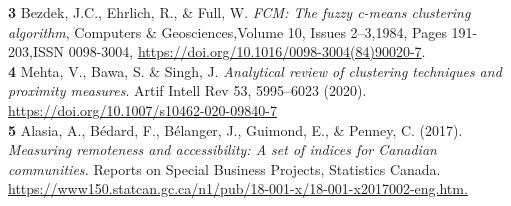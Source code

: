\documentclass[11pt, a4paper]{article}
\begin{document}
\noindent\textbf{3} Bezdek, J.C., Ehrlich, R., \& Full, W. \textit{FCM: The fuzzy c-means clustering algorithm}, Computers \& Geosciences,Volume 10, Issues 2–3,1984, Pages 191-203,ISSN 0098-3004, \sloppy\url{https://doi.org/10.1016/0098-3004(84)90020-7}. \\ %

\noindent\textbf{4} Mehta, V., Bawa, S. \& Singh, J. \textit{Analytical review of clustering techniques and proximity measures}. Artif Intell Rev 53, 5995–6023 (2020). \sloppy\url{https://doi.org/10.1007/s10462-020-09840-7} \\


\noindent\textbf{5} Alasia, A., Bédard, F., Bélanger, J., Guimond, E., \& Penney, C. (2017). \textit{Measuring remoteness and accessibility: A set of indices for Canadian communities.} Reports on Special Business Projects, Statistics Canada. \sloppy\url{https://www150.statcan.gc.ca/n1/pub/18-001-x/18-001-x2017002-eng.htm.} \\
\end{document}
